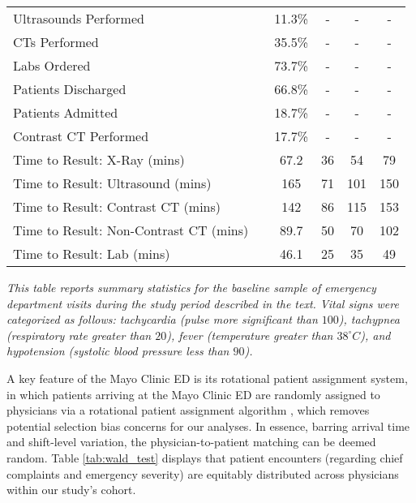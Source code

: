 \documentclass[,mnsc,nonblindrev]{informs}
\begin{document}
\begin{table}[ht]
\begin{threeparttable}
\begin{tabular}{lccccc}
Ultrasounds Performed & & {11.3\%} & {-} & {-} & {-} \\
CTs Performed & & {35.5\%} & {-} & {-} & {-} \\
Labs Ordered & & {73.7\%} & {-} & {-} & {-} \\
Patients Discharged & & {66.8\%} & {-} & {-} & {-} \\
Patients Admitted & & {18.7\%} & {-} & {-} & {-} \\
Contrast CT Performed & & {17.7\%} & {-} & {-} & {-} \\
Time to Result: X-Ray (mins) & & {67.2} & {36} & {54} & {79} \\
Time to Result: Ultrasound (mins) & & {165} & {71} & {101} & {150} \\
Time to Result: Contrast CT (mins) & & {142} & {86} & {115} & {153} \\
Time to Result: Non-Contrast CT (mins) & & {89.7} & {50} & {70} & {102} \\
Time to Result: Lab (mins) & & {46.1} & {25} & {35} & {49} \\
\bottomrule
\end{tabular}
\begin{tablenotes}
\small
\item \textit{This table reports summary statistics for the baseline sample of emergency department visits during the study period described in the text. Vital signs were categorized as follows: tachycardia (pulse more significant than $100$), tachypnea (respiratory rate greater than $20$), fever (temperature greater than $38^\circ C$), and hypotension (systolic blood pressure less than $90$).}
\end{tablenotes}
\end{threeparttable}
\end{table}

A key feature of the Mayo Clinic ED is its rotational patient assignment
system, in which patients arriving at the Mayo Clinic ED are randomly
assigned to physicians via a rotational patient assignment algorithm
\citet{traub2016emergency}, which removes potential selection bias
concerns for our analyses. In essence, barring arrival time and
shift-level variation, the physician-to-patient matching can be deemed
random. Table \ref{tab:wald_test} displays that patient encounters
(regarding chief complaints and emergency severity) are equitably
distributed across physicians within our study's cohort.
\end{document}
